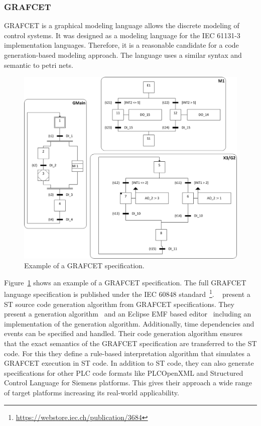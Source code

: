 \subsubsection{GRAFCET}
\label{sec:sub:grafcet}

GRAFCET is a graphical modeling language allows the discrete modeling of control systems.
It was designed as a modeling language for the IEC 61131-3 implementation languages.
Therefore, it is a reasonable candidate for a code generation-based modeling approach.
The language uses a similar syntax and semantic to petri nets.
\begin{figure}[h]
	\includegraphics[width=\textwidth]{./Figures/grafcet_ex.jpg}
	\caption[Example of a GRAFCET specification.]{Example of a GRAFCET specification.~\cite{JULIUS2017173}}
	\label{fig:grafcet}
\end{figure}
Figure~\ref{fig:grafcet} shows an example of a GRAFCET specification.
The full GRAFCET language specification is published under the IEC 60848 standard~\footnote{\url{https://webstore.iec.ch/publication/3684}}.
\citeauthor{JULIUS20191767}~\cite{JULIUS20191767, JULIUS2017173} present a ST source code generation algorithm from GRAFCET specifications.
They present a generation algorithm~\cite{JULIUS2017173} and an Eclipse EMF based editor~\cite{JULIUS20191767} including an implementation of the generation algorithm.
Additionally, time dependencies and events can be specified and handled.
Their code generation algorithm ensures that the exact semantics of the GRAFCET specification are transferred to the ST code.
For this they define a rule-based interpretation algorithm that simulates a GRAFCET execution in ST code.
In addition to ST code, they can also generate specifications for other PLC code formats like PLCOpenXML and Structured Control Language for Siemens platforms.
This gives their approach a wide range of target platforms increasing its real-world applicability.


